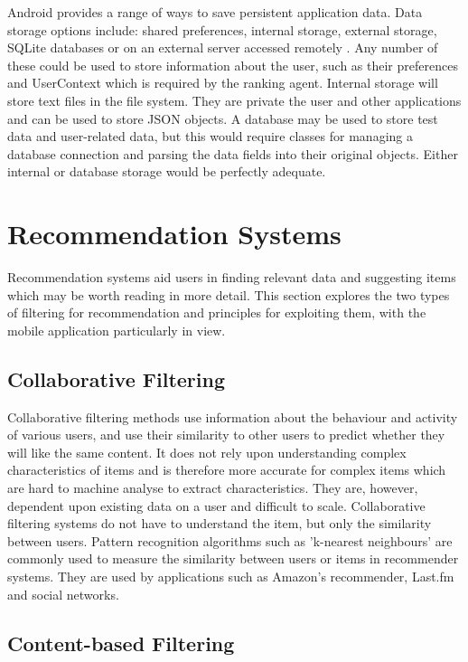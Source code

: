 Android provides a range of ways to save persistent application data. Data storage options include: shared preferences, internal storage, external storage, SQLite databases or on an external server accessed remotely \cite{BeginningAndroidDataPersistence}. Any number of these could be used to store information about the user, such as their preferences and UserContext which is required by the ranking agent. 
Internal storage will store text files in the file system. They are private the user and other applications and can be used to store JSON objects. A database may be used to store test data and user-related data, but this would require classes for managing a database connection and parsing the data fields into their original objects. Either internal or database storage would be perfectly adequate.

\section{Recommendation Systems}

Recommendation systems aid users in finding relevant data and suggesting items which may be worth reading in more detail. This section explores the two types of filtering for recommendation and principles for exploiting them, with the mobile application particularly in view.

\subsection{Collaborative Filtering}

Collaborative filtering methods \cite{CollaborativeRecommenderGoldberg} use information about the behaviour and activity of various users, and use their similarity to other users to predict whether they will like the same content. It does not rely upon understanding complex characteristics of items and is therefore more accurate for complex items which are hard to machine analyse to extract characteristics. They are, however, dependent upon existing data on a user and difficult to scale. Collaborative filtering systems do not have to understand the item, but only the similarity between users. Pattern recognition algorithms such as 'k-nearest neighbours' are commonly used to measure the similarity between users or items in recommender systems. They are used by applications such as Amazon's recommender, Last.fm and social networks. 

\subsection{Content-based Filtering}

